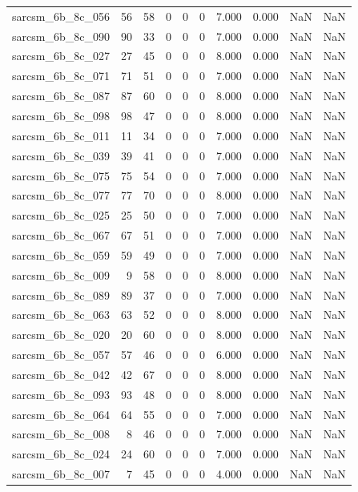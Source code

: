 \documentclass{article}
\begin{document}
\begin{longtable}{lrrrrrrrrr}
sarcsm\_6b\_8c\_056 & 56 & 58 & 0 & 0 & 0 & 7.000 & 0.000 & NaN & NaN \\
sarcsm\_6b\_8c\_090 & 90 & 33 & 0 & 0 & 0 & 7.000 & 0.000 & NaN & NaN \\
sarcsm\_6b\_8c\_027 & 27 & 45 & 0 & 0 & 0 & 8.000 & 0.000 & NaN & NaN \\
sarcsm\_6b\_8c\_071 & 71 & 51 & 0 & 0 & 0 & 7.000 & 0.000 & NaN & NaN \\
sarcsm\_6b\_8c\_087 & 87 & 60 & 0 & 0 & 0 & 8.000 & 0.000 & NaN & NaN \\
sarcsm\_6b\_8c\_098 & 98 & 47 & 0 & 0 & 0 & 8.000 & 0.000 & NaN & NaN \\
sarcsm\_6b\_8c\_011 & 11 & 34 & 0 & 0 & 0 & 7.000 & 0.000 & NaN & NaN \\
sarcsm\_6b\_8c\_039 & 39 & 41 & 0 & 0 & 0 & 7.000 & 0.000 & NaN & NaN \\
sarcsm\_6b\_8c\_075 & 75 & 54 & 0 & 0 & 0 & 7.000 & 0.000 & NaN & NaN \\
sarcsm\_6b\_8c\_077 & 77 & 70 & 0 & 0 & 0 & 8.000 & 0.000 & NaN & NaN \\
sarcsm\_6b\_8c\_025 & 25 & 50 & 0 & 0 & 0 & 7.000 & 0.000 & NaN & NaN \\
sarcsm\_6b\_8c\_067 & 67 & 51 & 0 & 0 & 0 & 7.000 & 0.000 & NaN & NaN \\
sarcsm\_6b\_8c\_059 & 59 & 49 & 0 & 0 & 0 & 7.000 & 0.000 & NaN & NaN \\
sarcsm\_6b\_8c\_009 & 9 & 58 & 0 & 0 & 0 & 8.000 & 0.000 & NaN & NaN \\
sarcsm\_6b\_8c\_089 & 89 & 37 & 0 & 0 & 0 & 7.000 & 0.000 & NaN & NaN \\
sarcsm\_6b\_8c\_063 & 63 & 52 & 0 & 0 & 0 & 8.000 & 0.000 & NaN & NaN \\
sarcsm\_6b\_8c\_020 & 20 & 60 & 0 & 0 & 0 & 8.000 & 0.000 & NaN & NaN \\
sarcsm\_6b\_8c\_057 & 57 & 46 & 0 & 0 & 0 & 6.000 & 0.000 & NaN & NaN \\
sarcsm\_6b\_8c\_042 & 42 & 67 & 0 & 0 & 0 & 8.000 & 0.000 & NaN & NaN \\
sarcsm\_6b\_8c\_093 & 93 & 48 & 0 & 0 & 0 & 8.000 & 0.000 & NaN & NaN \\
sarcsm\_6b\_8c\_064 & 64 & 55 & 0 & 0 & 0 & 7.000 & 0.000 & NaN & NaN \\
sarcsm\_6b\_8c\_008 & 8 & 46 & 0 & 0 & 0 & 7.000 & 0.000 & NaN & NaN \\
sarcsm\_6b\_8c\_024 & 24 & 60 & 0 & 0 & 0 & 7.000 & 0.000 & NaN & NaN \\
sarcsm\_6b\_8c\_007 & 7 & 45 & 0 & 0 & 0 & 4.000 & 0.000 & NaN & NaN \\

\end{longtable}
\end{document}
